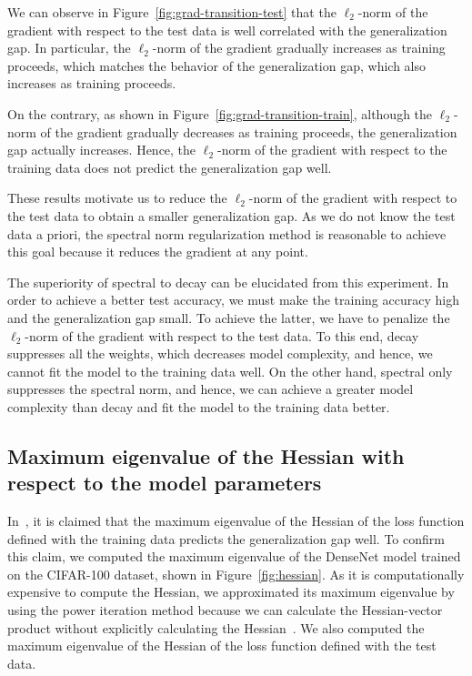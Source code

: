We can observe in Figure~\ref{fig:grad-transition-test} that the $\ell_2$-norm of the gradient with respect to the test data is well  correlated with the generalization gap. In particular, the $\ell_2$-norm of the gradient gradually increases as training proceeds, which matches the behavior of the generalization gap, which also increases as training proceeds.

On the contrary, as shown in Figure~\ref{fig:grad-transition-train}, although the $\ell_2$-norm of the gradient gradually decreases as training proceeds, the generalization gap actually increases. Hence, the $\ell_2$-norm of the gradient with respect to the training data does not predict the generalization gap well.

These results motivate us to reduce the $\ell_2$-norm of the gradient with respect to the test data to obtain a smaller generalization gap. As we do not know the test data a priori, the spectral norm regularization method is reasonable to achieve this goal because it reduces the gradient at any point.

The superiority of \textsf{spectral} to \textsf{decay} can be elucidated from this experiment. In order to achieve a better test accuracy, we must make the training accuracy high and the generalization gap small. To achieve the latter, we have to penalize the $\ell_2$-norm of the gradient with respect to the test data. To this end, \textsf{decay} suppresses all the weights, which decreases model complexity, and hence, we cannot fit the model to the training data well. On the other hand, \textsf{spectral} only suppresses the spectral norm, and hence, we can achieve a greater model complexity than \textsf{decay} and fit the model to the training data better.

\subsection{Maximum eigenvalue of the Hessian with respect to the model parameters}

In~\cite{Keskar:2017tz}, it is claimed that the maximum eigenvalue of the Hessian of the loss function defined with the training data predicts the generalization gap well. To confirm this claim, we computed the maximum eigenvalue of the DenseNet model trained on the CIFAR-100 dataset, shown in Figure~\ref{fig:hessian}.
As it is computationally expensive to compute the Hessian, we approximated its maximum eigenvalue by using the power iteration method because we can calculate the Hessian-vector product without explicitly calculating the Hessian~\cite{Martens:2010vo}. We also computed the maximum eigenvalue of the Hessian of the loss function defined with the test data.

